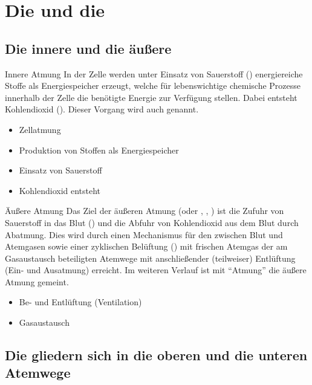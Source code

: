 \clearpage

\section{Die  und die }



\subsection{Die innere und die äußere }


\TextSlide
{Innere Atmung}%
{%
In der Zelle werden unter Einsatz 
von Sauerstoff () energiereiche Stoffe 
als Energiespeicher erzeugt, 
welche für lebenswichtige chemische Prozesse 
innerhalb der Zelle die benötigte Energie zur Verfügung stellen. 
%
Dabei entsteht Kohlendioxid (). 
%
Dieser Vorgang wird auch  genannt.
}%
{%
\begin{itemize}
  \item Zellatmung
  \item Produktion von Stoffen als Energiespeicher
  \item Einsatz von Sauerstoff
  \item Kohlendioxid entsteht
\end{itemize}
}%

\TextSlide
{Äußere Atmung}%
{%
Das Ziel der äußeren Atmung 
(oder , 
  , 
 ) 
ist die Zufuhr von Sauerstoff in das Blut () 
und die Abfuhr von Kohlendioxid 
aus dem Blut durch Abatmung.
%
Dies wird durch einen Mechanismus 
für den  
zwischen Blut 
und Atemgasen 
sowie einer zyklischen Belüftung () mit frischen Atemgas der am Gasaustausch beteiligten Atemwege 
mit anschließender (teilweiser) Entlüftung 
(Ein- und Ausatmung) 
erreicht. 
%
Im weiteren Verlauf ist mit \enquote{Atmung} die äußere Atmung gemeint.
}%
{
\begin{itemize}
  \item Be- und Entlüftung (Ventilation)
  \item Gasaustausch
\end{itemize}
}%


\subsection{Die  gliedern sich in die oberen und die unteren Atemwege}

